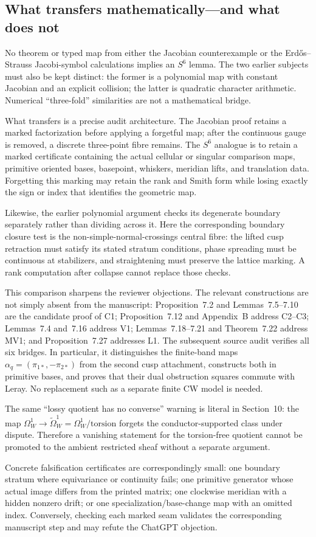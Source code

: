 \subsection{What transfers mathematically---and what does not}

No theorem or typed map from either the Jacobian counterexample or the
Erd\H{o}s--Strauss Jacobi-symbol calculations implies an $S^6$ lemma.  The two
earlier subjects must also be kept distinct: the former is a polynomial map
with constant Jacobian and an explicit collision; the latter is quadratic
character arithmetic.  Numerical ``three-fold'' similarities are not a
mathematical bridge.

What transfers is a precise audit architecture.  The Jacobian proof retains a
marked factorization before applying a forgetful map; after the continuous
gauge is removed, a discrete three-point fibre remains.  The $S^6$ analogue is
to retain a marked certificate containing the actual cellular or singular
comparison maps, primitive oriented bases, basepoint, whiskers, meridian
lifts, and translation data.  Forgetting this marking may retain the rank and
Smith form while losing exactly the sign or index that identifies the
geometric map.

Likewise, the earlier polynomial argument checks its degenerate boundary
separately rather than dividing across it.  Here the corresponding boundary
closure test is the non-simple-normal-crossings central fibre: the lifted cusp
retraction must satisfy its stated stratum conditions, phase spreading must be
continuous at stabilizers, and straightening must preserve the lattice
marking.  A rank computation after collapse cannot replace those checks.

This comparison sharpens the reviewer objections.  The relevant constructions
are not simply absent from the manuscript: Proposition~7.2 and
Lemmas~7.5--7.10 are the candidate proof of C1; Proposition~7.12 and
Appendix~B address C2--C3; Lemmas~7.4 and~7.16 address V1;
Lemmas~7.18--7.21 and Theorem~7.22 address MV1; and Proposition~7.27
addresses L1.  The subsequent source audit verifies all six bridges.  In
particular, it distinguishes the finite-band maps
$\alpha_q=(\pi_{1*},-\pi_{2*})$ from the second cusp attachment, constructs
both in primitive bases, and proves that their dual obstruction squares
commute with Leray.  No replacement such as a separate finite CW model is
needed.

The same ``lossy quotient has no converse'' warning is literal in Section~10:
the map $\Omega_W^1\to\widetilde\Omega_W^1=\Omega_W^1/\mathrm{torsion}$
forgets the conductor-supported class under dispute.  Therefore a vanishing
statement for the torsion-free quotient cannot be promoted to the ambient
restricted sheaf without a separate argument.

Concrete falsification certificates are correspondingly small: one boundary
stratum where equivariance or continuity fails; one primitive generator whose
actual image differs from the printed matrix; one clockwise meridian with a
hidden nonzero drift; or one specialization/base-change map with an omitted
index.  Conversely, checking each marked seam validates the corresponding
manuscript step and may refute the ChatGPT objection.
